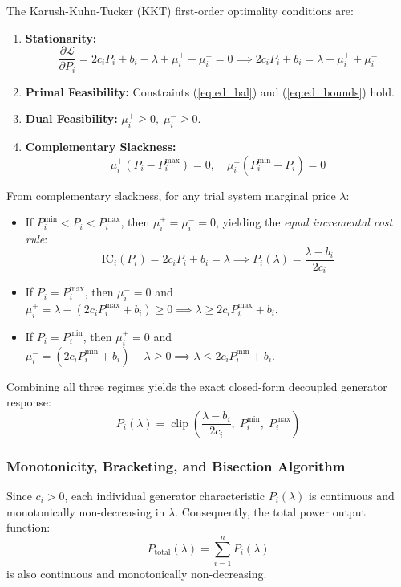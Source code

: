 The Karush-Kuhn-Tucker (KKT) first-order optimality conditions are:
\begin{enumerate}
    \item \textbf{Stationarity:}
    \begin{equation}
        \frac{\partial \mathcal{L}}{\partial P_i} = 2 c_i P_i + b_i - \lambda + \mu_i^+ - \mu_i^- = 0 \implies 2 c_i P_i + b_i = \lambda - \mu_i^+ + \mu_i^-
    \end{equation}
    \item \textbf{Primal Feasibility:} Constraints (\ref{eq:ed_bal}) and (\ref{eq:ed_bounds}) hold.
    \item \textbf{Dual Feasibility:} $\mu_i^+ \ge 0, \; \mu_i^- \ge 0$.
    \item \textbf{Complementary Slackness:}
    \begin{equation}
        \mu_i^+ (P_i - P_i^{\max}) = 0, \quad \mu_i^- (P_i^{\min} - P_i) = 0
    \end{equation}
\end{enumerate}

From complementary slackness, for any trial system marginal price $\lambda$:
\begin{itemize}
    \item If $P_i^{\min} < P_i < P_i^{\max}$, then $\mu_i^+ = \mu_i^- = 0$, yielding the \textit{equal incremental cost rule}:
    \begin{equation}
        \text{IC}_i(P_i) = 2 c_i P_i + b_i = \lambda \implies P_i(\lambda) = \frac{\lambda - b_i}{2 c_i}
    \end{equation}
    \item If $P_i = P_i^{\max}$, then $\mu_i^- = 0$ and $\mu_i^+ = \lambda - (2 c_i P_i^{\max} + b_i) \ge 0 \implies \lambda \ge 2 c_i P_i^{\max} + b_i$.
    \item If $P_i = P_i^{\min}$, then $\mu_i^+ = 0$ and $\mu_i^- = (2 c_i P_i^{\min} + b_i) - \lambda \ge 0 \implies \lambda \le 2 c_i P_i^{\min} + b_i$.
\end{itemize}

Combining all three regimes yields the exact closed-form decoupled generator response:
\begin{equation}
    P_i(\lambda) = \operatorname{clip}\left( \frac{\lambda - b_i}{2 c_i}, \; P_i^{\min}, \; P_i^{\max} \right)
\end{equation}

\subsubsection{Monotonicity, Bracketing, and Bisection Algorithm}
Since $c_i > 0$, each individual generator characteristic $P_i(\lambda)$ is continuous and monotonically non-decreasing in $\lambda$. Consequently, the total power output function:
\begin{equation}
    P_{\text{total}}(\lambda) = \sum_{i=1}^n P_i(\lambda)
\end{equation}
is also continuous and monotonically non-decreasing.

